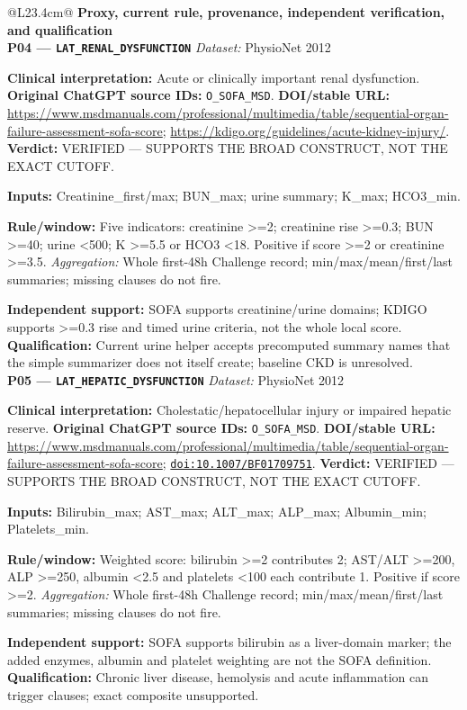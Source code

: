 \begin{tabular}{@{}L{23.4cm}@{}}
\toprule
\textbf{Proxy, current rule, provenance, independent verification, and qualification}\\
\midrule
\textbf{P04 --- \nolinkurl{LAT_RENAL_DYSFUNCTION}} \hfill \textit{Dataset:} PhysioNet 2012\par\textbf{Clinical interpretation:} Acute or clinically important renal dysfunction. \textbf{Original ChatGPT source IDs:} \nolinkurl{O_SOFA_MSD}. \textbf{DOI/stable URL:} \url{https://www.msdmanuals.com/professional/multimedia/table/sequential-organ-failure-assessment-sofa-score}; \allowbreak \url{https://kdigo.org/guidelines/acute-kidney-injury/}. \textbf{Verdict:} VERIFIED --- SUPPORTS THE BROAD CONSTRUCT, NOT THE EXACT CUTOFF.\par\textbf{Inputs:} Creatinine\_first/max; BUN\_max; urine summary; K\_max; HCO3\_min.\par\textbf{Rule/window:} Five indicators: creatinine >=2; creatinine rise >=0.3; BUN >=40; urine <500; K >=5.5 or HCO3 <18. Positive if score >=2 or creatinine >=3.5. \textit{Aggregation:} Whole first-48h Challenge record; min/max/mean/first/last summaries; missing clauses do not fire.\par\textbf{Independent support:} SOFA supports creatinine/urine domains; KDIGO supports >=0.3 rise and timed urine criteria, not the whole local score. \textbf{Qualification:} Current urine helper accepts precomputed summary names that the simple summarizer does not itself create; baseline CKD is unresolved. \\
\addlinespace[3pt]
\midrule
\textbf{P05 --- \nolinkurl{LAT_HEPATIC_DYSFUNCTION}} \hfill \textit{Dataset:} PhysioNet 2012\par\textbf{Clinical interpretation:} Cholestatic/hepatocellular injury or impaired hepatic reserve. \textbf{Original ChatGPT source IDs:} \nolinkurl{O_SOFA_MSD}. \textbf{DOI/stable URL:} \url{https://www.msdmanuals.com/professional/multimedia/table/sequential-organ-failure-assessment-sofa-score}; \allowbreak \href{https://doi.org/10.1007/BF01709751}{\nolinkurl{doi:10.1007/BF01709751}}. \textbf{Verdict:} VERIFIED --- SUPPORTS THE BROAD CONSTRUCT, NOT THE EXACT CUTOFF.\par\textbf{Inputs:} Bilirubin\_max; AST\_max; ALT\_max; ALP\_max; Albumin\_min; Platelets\_min.\par\textbf{Rule/window:} Weighted score: bilirubin >=2 contributes 2; AST/ALT >=200, ALP >=250, albumin <2.5 and platelets <100 each contribute 1. Positive if score >=2. \textit{Aggregation:} Whole first-48h Challenge record; min/max/mean/first/last summaries; missing clauses do not fire.\par\textbf{Independent support:} SOFA supports bilirubin as a liver-domain marker; the added enzymes, albumin and platelet weighting are not the SOFA definition. \textbf{Qualification:} Chronic liver disease, hemolysis and acute inflammation can trigger clauses; exact composite unsupported. \\

\end{tabular}
